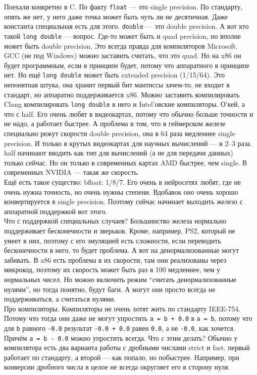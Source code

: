 \documentclass{article}
\begin{document}
    Поехали конкретно в C. По факту \texttt{float} --- это single precision. По стандарту, опять же нет, у него даже точка может быть чуть ли не десятичная. Даже константа специальная есть для этого. \texttt{double} --- это double precision. А вот кто такой \texttt{long double} --- вопрос. Где-то может быть и quad precision, но вполне может быть double precision. Это всегда правда для компиляторов Microsoft. GCC (не под Windows) можно заставить считать, что это quad. Но на x86 он будет программным, если в принципе будет, потому что аппаратного в принципе нет. Но ещё \texttt{long double} может быть extended precision (1/15/64). Это непонятная штука, она хранит первый бит мантиссы зачем-то, не входит в стандарт, но аппаратно поддерживается x86. Можно заставить компилировать Clang компилировать \texttt{long double} в него и Intel'овские компиляторы. О'кей, а что с half. Его очень любят в видеокартах, потому что обычно больше точности и не надо, а работает быстрее. А проблема в том, что в геймерском железе специально режут скорости double precision, она в 64 раза медленнее single precision. И только в крутых видеокартах для научных вычислений --- в 2--3 раза. half начинают вводить как тип для вычислений (а не для передачи данных) только сейчас. Но он только в современных картах AMD быстрее, чем single. В современных NVIDIA --- такая же скорость.\\
    Ещё есть такое существо: bfloat: 1/8/7. Его очень в нейросетях любят, где не очень нужна точность, но очень нужны степени. Вдобавок оно очень хорошо конвертируется в single precision. Поэтому сейчас начинает выходить железо с аппаратной поддержкой вот этого.\\
    Что с поддержкой специальных случаев? Большинство железа нормально поддерживает бесконечности и зверьков. Кроме, например, PS2, который не умеет в них, поэтому с его эмуляцией есть сложности, если переводить бесконечности в него, то будет проблема. А вот на денормализованные могут забивать. В x86 есть проблема в их скорости, там они реализованы через микрокод, поэтому их скорость может быть раз в 100 медленнее, чем у нормальных чисел. Но можно включить режим ``считать денормализованные нулями'', но тогда понятно, будут баги. А могут они просто всегда не поддерживаться, а считаться нулями.\\
    Про компиляторы. Компиляторы не очень хотят жить по стандарту IEEE-754. Потому что тогда они даже не могут упростить \texttt{a = b + 0.0} в \texttt{a = b}, потому что для \texttt{b} равного \texttt{-0.0} результат \texttt{-0.0 + 0.0} равен \texttt{0.0}, а не \texttt{-0.0}, как хочется. Причём \texttt{a = b - 0.0} можно упростить всегда. Что с этим делать? Обычно у компилятора есть два варианта работы с дробными числами strict и fast. первый работает по стандарту, а второй --- как попало, но побыстрее. Например, при конверсии дробного числа в целое не всегда округляет его в сторону нуля.
\end{document}
